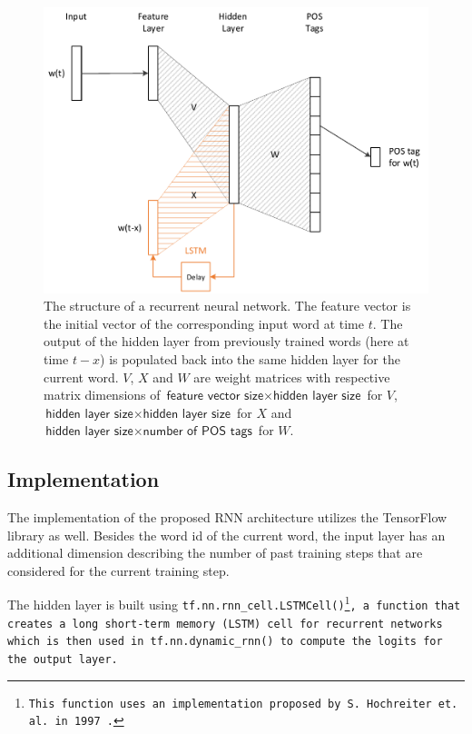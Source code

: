 \begin{figure}[ht]
	\includegraphics[width=\textwidth]{images/rnn_structure}
	\caption[Structure of a Recurrent Neural Network]{The structure of a recurrent neural network. The feature vector is the initial vector of the corresponding input word at time $t$. The output of the hidden layer from previously trained words (here at time $t-x$) is populated back into the same hidden layer for the current word. $V$, $X$ and $W$ are weight matrices with respective matrix dimensions of $\textsf{feature vector size} \times \textsf{hidden layer size}$ for $V$, $\textsf{hidden layer size} \times \textsf{hidden layer size}$ for $X$ and $\textsf{hidden layer size} \times \textsf{number of POS tags}$ for $W$.}
	\label{f.rnn.structure}
\end{figure}

\subsection{Implementation}\label{c.postagging.rnn.implementation}
The implementation of the proposed RNN architecture utilizes the TensorFlow library as well. Besides the word id of the current word, the input layer has an additional dimension describing the number of past training steps that are considered for the current training step.

The hidden layer is built using \tt{tf.nn.rnn\_cell.LSTMCell()}\footnote{This function uses an implementation proposed by S. Hochreiter et. al. in 1997 \cite{hochreiter1997}.}, a function that creates a long short-term memory (LSTM) cell for recurrent networks which is then used in \tt{tf.nn.dynamic\_rnn()} to compute the logits for the output layer.

